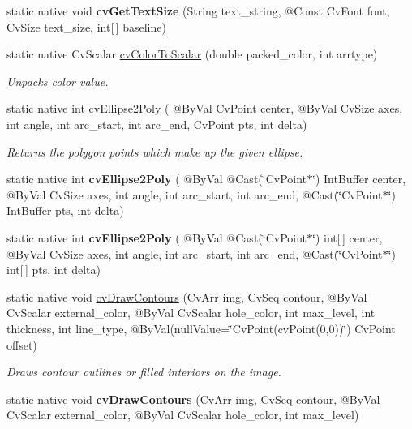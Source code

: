 \begin{DoxyCompactItemize}
\item 
static native void {\bfseries cv\+Get\+Text\+Size} (String text\+\_\+string, @Const Cv\+Font font, Cv\+Size text\+\_\+size, int\mbox{[}$\,$\mbox{]} baseline)
\item 
static native Cv\+Scalar \hyperlink{group__imgproc__c_ga740bdb87be7fa22bb0fda2e620a13777}{cv\+Color\+To\+Scalar} (double packed\+\_\+color, int arrtype)
\begin{DoxyCompactList}\small\item\em Unpacks color value. \end{DoxyCompactList}\item 
static native int \hyperlink{group__imgproc__c_ga4636892155a3d693c0906197d7777d0c}{cv\+Ellipse2\+Poly} ( @By\+Val Cv\+Point center, @By\+Val Cv\+Size axes, int angle, int arc\+\_\+start, int arc\+\_\+end, Cv\+Point pts, int delta)
\begin{DoxyCompactList}\small\item\em Returns the polygon points which make up the given ellipse. \end{DoxyCompactList}\item 
static native int {\bfseries cv\+Ellipse2\+Poly} ( @By\+Val @Cast(\char`\"{}Cv\+Point$\ast$\char`\"{}) Int\+Buffer center, @By\+Val Cv\+Size axes, int angle, int arc\+\_\+start, int arc\+\_\+end, @Cast(\char`\"{}Cv\+Point$\ast$\char`\"{}) Int\+Buffer pts, int delta)
\item 
static native int {\bfseries cv\+Ellipse2\+Poly} ( @By\+Val @Cast(\char`\"{}Cv\+Point$\ast$\char`\"{}) int\mbox{[}$\,$\mbox{]} center, @By\+Val Cv\+Size axes, int angle, int arc\+\_\+start, int arc\+\_\+end, @Cast(\char`\"{}Cv\+Point$\ast$\char`\"{}) int\mbox{[}$\,$\mbox{]} pts, int delta)
\item 
static native void \hyperlink{group__imgproc__c_ga225fad4fc8d41e9c4235b5b6e11de7c9}{cv\+Draw\+Contours} (Cv\+Arr img, Cv\+Seq contour, @By\+Val Cv\+Scalar external\+\_\+color, @By\+Val Cv\+Scalar hole\+\_\+color, int max\+\_\+level, int thickness, int line\+\_\+type, @By\+Val(null\+Value=\char`\"{}Cv\+Point(cv\+Point(0,0))\char`\"{}) Cv\+Point offset)
\begin{DoxyCompactList}\small\item\em Draws contour outlines or filled interiors on the image. \end{DoxyCompactList}\item 
static native void {\bfseries cv\+Draw\+Contours} (Cv\+Arr img, Cv\+Seq contour, @By\+Val Cv\+Scalar external\+\_\+color, @By\+Val Cv\+Scalar hole\+\_\+color, int max\+\_\+level)

\end{DoxyCompactItemize}
